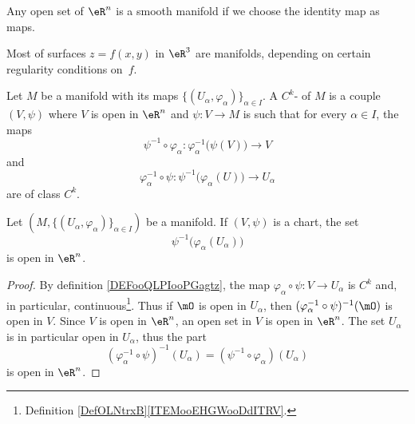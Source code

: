 \begin{example}
    Any open set of $\eR^n$ is a smooth manifold if we choose the identity map as maps.
\end{example} 

Most of surfaces $z=f(x,y)$ in $\eR^3$ are manifolds, depending on certain regularity conditions on~$f$.

\begin{definition}       \label{DEFooQLPIooPGagtz}
    Let \( M\) be a manifold with its maps \(  \{ (U_{\alpha}, \varphi_{\alpha}) \}_{\alpha\in I}   \). A \( C^k\)- of \( M\) is a couple \( (V,\psi)\) where \( V\) is open in \( \eR^n\) and \( \psi\colon V\to M\) is such that for every \( \alpha\in I\), the maps
    \begin{equation}
        \psi^{-1}\circ \varphi_{\alpha}\colon \varphi_{\alpha}^{-1}\big( \psi(V) \big)\to V
    \end{equation}
    and
    \begin{equation}
        \varphi_{\alpha}^{-1}\circ \psi\colon \psi^{-1}\big( \varphi_{\alpha}(U) \big)\to U_{\alpha}
    \end{equation}
    are of class \( C^k\).
\end{definition}

\begin{lemma}       \label{LEMooGAMVooIWUzmy}
    Let \( (M,\{ (U_{\alpha}, \varphi_{\alpha}) \}_{\alpha\in I}) \) be a manifold. If \( (V,\psi)\) is a chart, the set
    \begin{equation}
        \psi^{-1}\big(\varphi_{\alpha}(U_{\alpha})\big)
    \end{equation}
    is open in \(\eR^n\).
\end{lemma}

\begin{proof}
    By definition \ref{DEFooQLPIooPGagtz}, the map \( \varphi_{\alpha}\circ \psi \colon V\to U_{\alpha}\) is \( C^k\) and, in particular, continuous\footnote{Definition \ref{DefOLNtrxB}\ref{ITEMooEHGWooDdITRV}.}. Thus if \( \mO\) is open in \( U_{\alpha}\), then \( (\varphi_{\alpha}^{-1}\circ\psi)^{-1}(\mO)\) is open in \( V\). Since \( V\) is open in \( \eR^n\), an open set in \( V\) is open in \( \eR^n\). The set \( U_{\alpha}\) is in particular open in \( U_{\alpha}\), thus the part
    \begin{equation}
        (\varphi_{\alpha}^{-1}\circ \psi)^{-1}(U_{\alpha})=(\psi^{-1}\circ\varphi_{\alpha})(U_{\alpha})
    \end{equation}
    is open in \( \eR^n\).
\end{proof}

